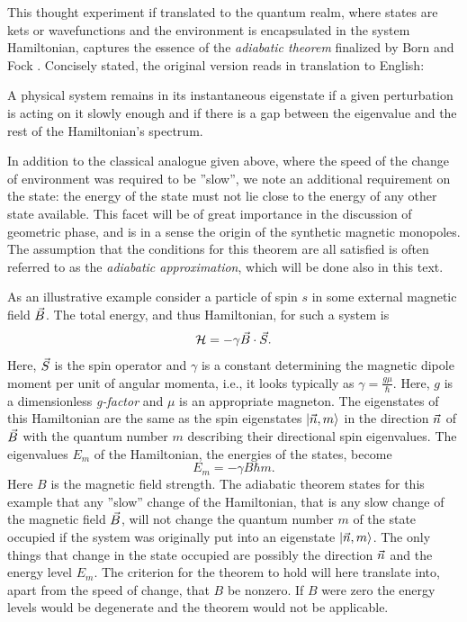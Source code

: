 \documentclass[main.tex]{subfiles}
\begin{document}
This thought experiment if translated to the quantum realm, where states are kets or
wavefunctions and the environment is encapsulated in the system Hamiltonian, captures the
essence of the \textit{adiabatic theorem} finalized by Born and Fock \cite{adiab}. Concisely
stated, the original version reads in translation to English:
\begin{displayquote}
A physical system remains in its instantaneous eigenstate if a given perturbation is acting
on it slowly enough and if there is a gap between the eigenvalue and the rest of the
Hamiltonian's spectrum.
\end{displayquote}

In addition to the classical analogue given above, where the speed of the change of
environment was required to be ''slow'', we note an additional requirement on the state: the
energy of the state must not lie close to the energy of any other state available. This
facet will be of great importance in the discussion of geometric phase, and is in a sense the
origin of the synthetic magnetic monopoles. The assumption that the conditions for this
theorem are all satisfied is often referred to as the \textit{adiabatic approximation},
which will be done also in this text.

As an illustrative example consider a particle of spin \(s\) in some external magnetic
field \(\vec{B}\). The total energy, and thus Hamiltonian, for such a system is \[
\mathbb{\cal H} = -\gamma \vec{B}\cdot \vec{S}
.\] 
Here, \(\vec{S}\) is the spin operator and \(\gamma\) is a constant determining the magnetic
dipole moment per unit of angular momenta, i.e., it looks typically as \(\gamma =
\frac{g\mu}{\hbar{}}\). Here, \(g\) is a dimensionless \textit{g-factor} and
\(\mu\) is an appropriate magneton. The eigenstates of this Hamiltonian are the same as the
spin eigenstates \(\ket{\vec{n}, m}\) in the direction \(\vec{n}\) of \(\vec{B}\) with the
quantum number \(m\) describing their directional spin eigenvalues. The eigenvalues \(E_m\)
of the
Hamiltonian, the energies of the states, become \[
E_m = -\gamma B \hbar{} m
.\] 
Here \(B\) is the magnetic field strength. The adiabatic theorem states for this
example that any ''slow'' change of the Hamiltonian, that is any slow change of the
magnetic field \(\vec{B}\), will not change the quantum number \(m\) of the state occupied
if the system was originally
put into an eigenstate \(\ket{\vec{n}, m}\). The only things that change in the state
occupied are
possibly the direction \(\vec{n}\) and the energy level \(E_m\). The criterion for the
theorem to hold will here translate into, apart from the speed of change, that \(B\) be
nonzero. If \(B\) were zero the energy levels would be degenerate and the theorem would not be applicable.
\end{document}
